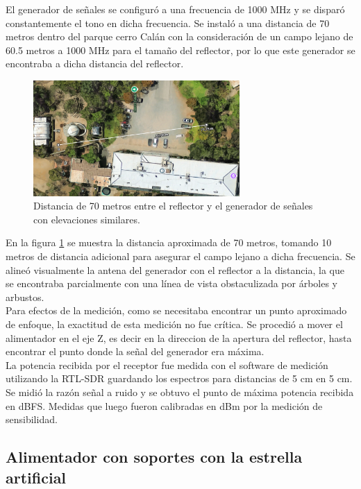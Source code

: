 El generador de señales se configuró a una frecuencia de 1000 MHz y se disparó constantemente el tono en dicha frecuencia. Se instaló a una distancia de 70 metros dentro del parque cerro Calán con la consideración de un campo lejano de 60.5 metros a 1000 MHz para el tamaño del reflector, por lo que este generador se encontraba a dicha distancia del reflector.\\

\begin{figure}
    \centering
    \includegraphics[width=0.7\textwidth]{img/70m_measure}
    \caption{Distancia de 70 metros entre el reflector y el generador de señales con elevaciones similares.}
    \label{fig:70m_measure}
\end{figure} 

En la figura \ref{fig:70m_measure} se muestra la distancia aproximada de 70 metros, tomando 10 metros de distancia adicional para asegurar el campo lejano a dicha frecuencia. Se alineó visualmente la antena del generador con el reflector a la distancia, la que se encontraba parcialmente con una línea de vista obstaculizada por árboles y arbustos.\\

Para efectos de la medición, como se necesitaba encontrar un punto aproximado de enfoque, la exactitud de esta medición no fue crítica. Se procedió a mover el alimentador en el eje Z, es decir en la direccion de la apertura del reflector, hasta encontrar el punto donde la señal del generador era máxima.\\

La potencia recibida por el receptor fue medida con el software de medición utilizando la RTL-SDR guardando los espectros para distancias de 5 cm en 5 cm. Se midió la razón señal a ruido y se obtuvo el punto de máxima potencia recibida en dBFS. Medidas que luego fueron calibradas en dBm por la medición de sensibilidad.\\

\subsection{Alimentador con soportes con la estrella artificial}


